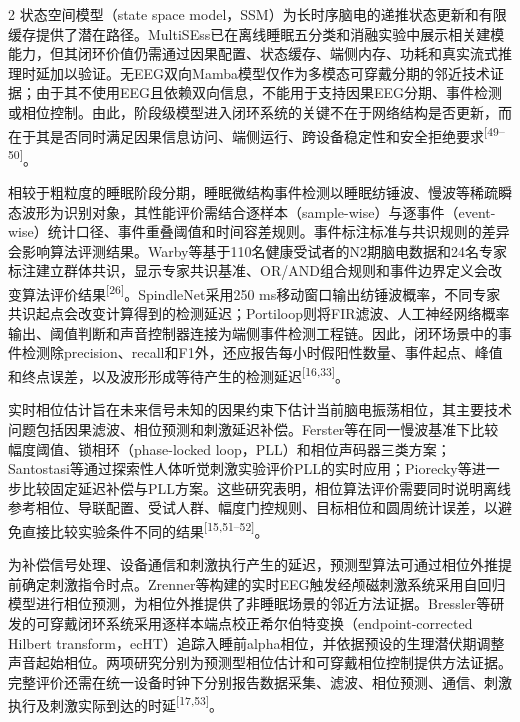 \documentclass[UTF8,zihao=5,fontset=none]{ctexart}
\newcommand{\song}{\CJKfamily{song}}
\newcommand{\levelthree}[1]{%
  \par\noindent{\song\fontsize{10.5pt}{15.6pt}\selectfont #1}}
\newcommand{\refcite}[1]{\nolinebreak[4]\textsuperscript{[#1]}}
\begin{document}
\begin{multicols}{2}
状态空间模型（state space model，SSM）为长时序脑电的递推状态更新和有限缓存提供了潜在路径。MultiSEss已在离线睡眠五分类和消融实验中展示相关建模能力，但其闭环价值仍需通过因果配置、状态缓存、端侧内存、功耗和真实流式推理时延加以验证。无EEG双向Mamba模型仅作为多模态可穿戴分期的邻近技术证据；由于其不使用EEG且依赖双向信息，不能用于支持因果EEG分期、事件检测或相位控制。由此，阶段级模型进入闭环系统的关键不在于网络结构是否更新，而在于其是否同时满足因果信息访问、端侧运行、跨设备稳定性和安全拒绝要求\refcite{49--50}。\par

\levelthree{2.2.4 事件检测与相位预测算法}
相较于粗粒度的睡眠阶段分期，睡眠微结构事件检测以睡眠纺锤波、慢波等稀疏瞬态波形为识别对象，其性能评价需结合逐样本（sample-wise）与逐事件（event-wise）统计口径、事件重叠阈值和时间容差规则。事件标注标准与共识规则的差异会影响算法评测结果。Warby等基于110名健康受试者的N2期脑电数据和24名专家标注建立群体共识，显示专家共识基准、OR/AND组合规则和事件边界定义会改变算法评价结果\refcite{26}。SpindleNet采用250 ms移动窗口输出纺锤波概率，不同专家共识起点会改变计算得到的检测延迟；Portiloop则将FIR滤波、人工神经网络概率输出、阈值判断和声音控制器连接为端侧事件检测工程链。因此，闭环场景中的事件检测除precision、recall和F1外，还应报告每小时假阳性数量、事件起点、峰值和终点误差，以及波形形成等待产生的检测延迟\refcite{16,33}。\par

实时相位估计旨在未来信号未知的因果约束下估计当前脑电振荡相位，其主要技术问题包括因果滤波、相位预测和刺激延迟补偿。Ferster等在同一慢波基准下比较幅度阈值、锁相环（phase-locked loop，PLL）和相位声码器三类方案；Santostasi等通过探索性人体听觉刺激实验评价PLL的实时应用；Piorecky等进一步比较固定延迟补偿与PLL方案。这些研究表明，相位算法评价需要同时说明离线参考相位、导联配置、受试人群、幅度门控规则、目标相位和圆周统计误差，以避免直接比较实验条件不同的结果\refcite{15,51--52}。\par

为补偿信号处理、设备通信和刺激执行产生的延迟，预测型算法可通过相位外推提前确定刺激指令时点。Zrenner等构建的实时EEG触发经颅磁刺激系统采用自回归模型进行相位预测，为相位外推提供了非睡眠场景的邻近方法证据。Bressler等研发的可穿戴闭环系统采用逐样本端点校正希尔伯特变换（endpoint-corrected Hilbert transform，ecHT）追踪入睡前alpha相位，并依据预设的生理潜伏期调整声音起始相位。两项研究分别为预测型相位估计和可穿戴相位控制提供方法证据。完整评价还需在统一设备时钟下分别报告数据采集、滤波、相位预测、通信、刺激执行及刺激实际到达的时延\refcite{17,53}。\par


\end{multicols}
\end{document}
